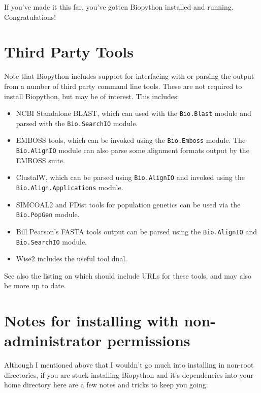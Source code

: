 \documentclass{article}
\begin{document}
If you've made it this far, you've gotten Biopython installed and running.
Congratulations!

\section{Third Party Tools}

Note that Biopython includes support for interfacing with or parsing the output from a number of third party command line tools.  These are not required to install Biopython, but may be of interest.  This includes:

\begin{itemize}
\item NCBI Standalone BLAST, which can used with the \verb|Bio.Blast| module and parsed with the \verb|Bio.SearchIO| module.
\item EMBOSS tools, which can be invoked using the \verb|Bio.Emboss| module.  The \verb|Bio.AlignIO| module can also parse some alignment formats output by the EMBOSS suite.
\item ClustalW, which can be parsed using \verb|Bio.AlignIO| and invoked using the \verb|Bio.Align.Applications| module.
\item SIMCOAL2 and FDist tools for population genetics can be used via the \verb|Bio.PopGen| module.
\item Bill Pearson's FASTA tools output can be parsed using the \verb|Bio.AlignIO| and \verb|Bio.SearchIO| module.
\item Wise2 includes the useful tool dnal.
\end{itemize}

\noindent
See also the listing on  which should include URLs for these tools, and may also be more up to date.

\section{Notes for installing with non-administrator permissions}

Although I mentioned above that I wouldn't go much into installing in
non-root directories, if you are stuck installing
Biopython and it's dependencies into your home directory here are a
few notes and tricks to keep you going:
\end{document}
